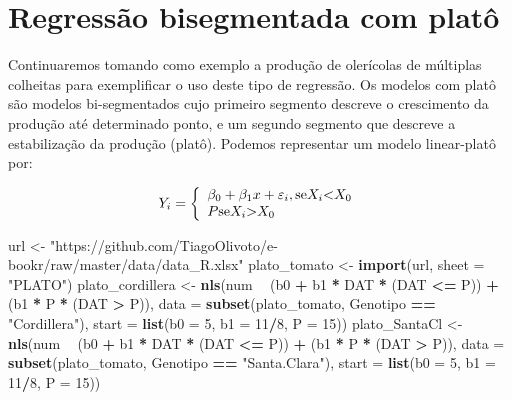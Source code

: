 \documentclass[
]{book}
\newenvironment{Shaded}{\begin{snugshade}}{\end{snugshade}}
\newcommand{\DataTypeTok}[1]{\textcolor[rgb]{0.13,0.29,0.53}{#1}}
\newcommand{\DecValTok}[1]{\textcolor[rgb]{0.00,0.00,0.81}{#1}}
\newcommand{\KeywordTok}[1]{\textcolor[rgb]{0.13,0.29,0.53}{\textbf{#1}}}
\newcommand{\NormalTok}[1]{#1}
\newcommand{\OperatorTok}[1]{\textcolor[rgb]{0.81,0.36,0.00}{\textbf{#1}}}
\newcommand{\StringTok}[1]{\textcolor[rgb]{0.31,0.60,0.02}{#1}}
\begin{document}
\hypertarget{regressuxe3o-bisegmentada-com-platuxf4}{%
\section{Regressão bisegmentada com platô}\label{regressuxe3o-bisegmentada-com-platuxf4}}

Continuaremos tomando como exemplo a produção de olerícolas de múltiplas colheitas para exemplificar o uso deste tipo de regressão. Os modelos com platô são modelos bi-segmentados cujo primeiro segmento descreve o crescimento da produção até determinado ponto, e um segundo segmento que descreve a estabilização da produção (platô). Podemos representar um modelo linear-platô por:

\[
{Y_i} = \left\{ \begin{array}{l}{\beta _0} + {\beta _1}x + {\varepsilon _i}{\rm{, se }}{X_i}{\rm{  <  }}{X_0}\\P{\rm{ se }}{X_i}{\rm{  >  }}{X_0}{\rm{ }}\end{array} \right.
\]

\begin{Shaded}
\begin{Highlighting}[]
\NormalTok{url <-}\StringTok{ "https://github.com/TiagoOlivoto/e-bookr/raw/master/data/data_R.xlsx"}
\NormalTok{plato_tomato <-}\StringTok{ }\KeywordTok{import}\NormalTok{(url, }\DataTypeTok{sheet =} \StringTok{"PLATO"}\NormalTok{)}
\NormalTok{plato_cordillera <-}\StringTok{ }
\StringTok{  }\KeywordTok{nls}\NormalTok{(num }\OperatorTok{~}\StringTok{ }\NormalTok{(b0 }\OperatorTok{+}\StringTok{ }\NormalTok{b1 }\OperatorTok{*}\StringTok{ }\NormalTok{DAT }\OperatorTok{*}\StringTok{ }\NormalTok{(DAT }\OperatorTok{<=}\StringTok{ }\NormalTok{P)) }\OperatorTok{+}\StringTok{ }\NormalTok{(b1 }\OperatorTok{*}\StringTok{ }\NormalTok{P }\OperatorTok{*}\StringTok{ }\NormalTok{(DAT }\OperatorTok{>}\StringTok{ }\NormalTok{P)),}
      \DataTypeTok{data =} \KeywordTok{subset}\NormalTok{(plato_tomato, Genotipo }\OperatorTok{==}\StringTok{ "Cordillera"}\NormalTok{),}
      \DataTypeTok{start =} \KeywordTok{list}\NormalTok{(}\DataTypeTok{b0 =} \DecValTok{5}\NormalTok{, }\DataTypeTok{b1 =} \DecValTok{11}\OperatorTok{/}\DecValTok{8}\NormalTok{, }\DataTypeTok{P =} \DecValTok{15}\NormalTok{))}
\NormalTok{plato_SantaCl <-}\StringTok{ }
\StringTok{  }\KeywordTok{nls}\NormalTok{(num }\OperatorTok{~}\StringTok{ }\NormalTok{(b0 }\OperatorTok{+}\StringTok{ }\NormalTok{b1 }\OperatorTok{*}\StringTok{ }\NormalTok{DAT }\OperatorTok{*}\StringTok{ }\NormalTok{(DAT }\OperatorTok{<=}\StringTok{ }\NormalTok{P)) }\OperatorTok{+}\StringTok{ }\NormalTok{(b1 }\OperatorTok{*}\StringTok{ }\NormalTok{P }\OperatorTok{*}\StringTok{ }\NormalTok{(DAT }\OperatorTok{>}\StringTok{ }\NormalTok{P)),}
      \DataTypeTok{data =} \KeywordTok{subset}\NormalTok{(plato_tomato, Genotipo }\OperatorTok{==}\StringTok{ "Santa.Clara"}\NormalTok{),}
      \DataTypeTok{start =} \KeywordTok{list}\NormalTok{(}\DataTypeTok{b0 =} \DecValTok{5}\NormalTok{, }\DataTypeTok{b1 =} \DecValTok{11}\OperatorTok{/}\DecValTok{8}\NormalTok{, }\DataTypeTok{P =} \DecValTok{15}\NormalTok{))}
\end{Highlighting}
\end{Shaded}
\end{document}
